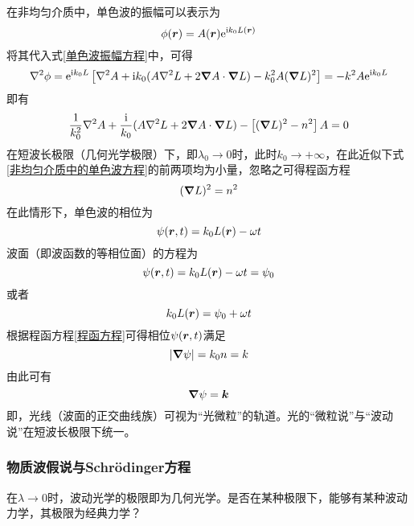 在非均匀介质中，单色波的振幅可以表示为
\begin{equation*}
	\phi(\boldsymbol{r}) = A(\boldsymbol{r}) \mathrm{e}^{\mathrm{i}k_0 L(\boldsymbol{r})}
\end{equation*}
将其代入式\eqref{单色波振幅方程}中，可得
\begin{equation*}
	\nabla^2 \phi = \mathrm{e}^{\mathrm{i}k_0 L} \left[\nabla^2 A + \mathrm{i} k_0(A\nabla^2 L + 2\boldsymbol{\nabla} A \cdot \boldsymbol{\nabla} L) - k_0^2 A(\boldsymbol{\nabla} L)^2 \right] = -k^2 A \mathrm{e}^{\mathrm{i} k_0 L}
\end{equation*}
即有
\begin{equation}
	\frac{1}{k_0^2} \nabla^2 A + \frac{\mathrm{i}}{k_0} (A\nabla^2 L + 2\boldsymbol{\nabla} A \cdot \boldsymbol{\nabla} L) - \left[(\boldsymbol{\nabla} L)^2 - n^2\right] A = 0
	\label{非均匀介质中的单色波方程}
\end{equation}
在短波长极限（几何光学极限）下，即$\lambda_0 \to 0$时，此时$k_0 \to +\infty$，在此近似下式\eqref{非均匀介质中的单色波方程}的前两项均为小量，忽略之可得{\heiti 程函方程}
\begin{equation}
	(\boldsymbol{\nabla} L)^2 = n^2
	\label{程函方程}
\end{equation}
在此情形下，单色波的相位为
\begin{equation*}
	\psi(\boldsymbol{r},t) = k_0 L(\boldsymbol{r}) - \omega t
\end{equation*}
波面（即波函数的等相位面）的方程为
\begin{equation*}
	\psi(\boldsymbol{r},t) = k_0 L(\boldsymbol{r}) - \omega t = \psi_0
\end{equation*}
或者
\begin{equation*}
	k_0 L(\boldsymbol{r}) = \psi_0 + \omega t
\end{equation*}
根据程函方程\eqref{程函方程}可得相位$\psi(\boldsymbol{r},t)$满足
\begin{equation*}
	|\boldsymbol{\nabla} \psi| = k_0 n = k
\end{equation*}
由此可有
\begin{equation*}
	\boldsymbol{\nabla} \psi = \boldsymbol{k}
\end{equation*}
即，光线（波面的正交曲线族）可视为``光微粒''的轨道。光的``微粒说''与``波动说''在短波长极限下统一。

\subsubsection{物质波假说与Schr\"{o}dinger方程}

在$\lambda \to 0$时，波动光学的极限即为几何光学。是否在某种极限下，能够有某种波动力学，其极限为经典力学？

